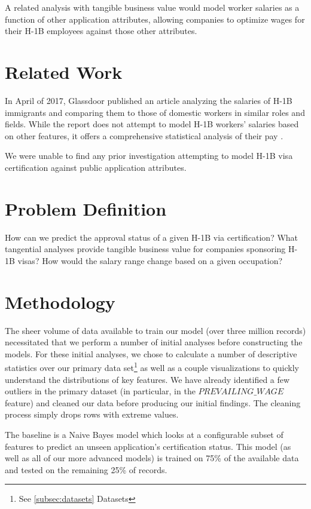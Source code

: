 \documentclass[sigconf]{acmart}
\begin{document}
A related analysis with tangible business value would model worker salaries as a function of other
application attributes, allowing companies to optimize wages for their H-1B employees against those
other attributes.


\section{Related Work}

In April of 2017, Glassdoor published an article analyzing the salaries of H-1B immigrants and
comparing them to those of domestic workers in similar roles and fields. While the report does
not attempt to model H-1B workers' salaries based on other features, it offers a comprehensive
statistical analysis of their pay \cite{Glassdoor}.

We were unable to find any prior investigation attempting to model H-1B visa certification
against public application attributes.


\section{Problem Definition}

How can we predict the approval status of a given H-1B via certification? What tangential
analyses provide tangible business value for companies sponsoring H-1B visas? How would the salary
range change based on a given occupation?


\section{Methodology}

The sheer volume of data available to train our model (over three million records) necessitated
that we perform a number of initial analyses before constructing the models. For these initial
analyses, we chose to calculate a number of descriptive statistics over our primary data set\footnote{See
\ref{subsec:datasets} Datasets} as well as a couple visualizations to quickly understand the
distributions of key features.
We have already identified a few outliers in the primary dataset (in particular, in the
$PREVAILING\_WAGE$ feature) and cleaned our data before producing our initial findings. The
cleaning process simply drops rows with extreme values.

The baseline is a Naive Bayes model which looks at a configurable subset of features to predict
an unseen application's certification status. This model (as well as all of our more advanced models)
is trained on 75\% of the available data and tested on the remaining 25\% of records.
\end{document}
